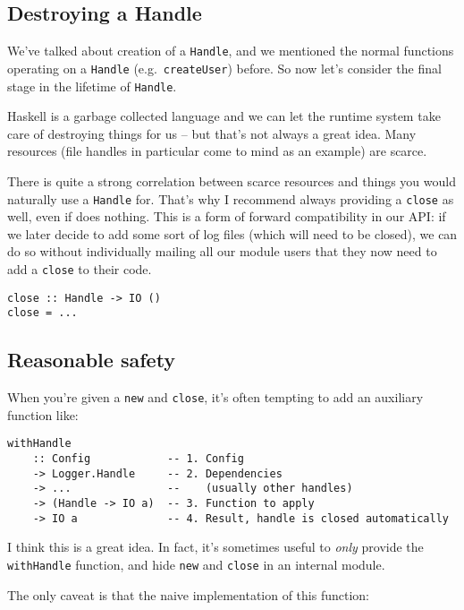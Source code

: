 \subsection{Destroying a Handle}

We've talked about creation of a \texttt{Handle}, and we mentioned the
normal functions operating on a \texttt{Handle}
(e.g.~\texttt{createUser}) before. So now let's consider the final stage
in the lifetime of \texttt{Handle}.

Haskell is a garbage collected language and we can let the runtime
system take care of destroying things for us -- but that's not always a
great idea. Many resources (file handles in particular come to mind as
an example) are scarce.

There is quite a strong correlation between scarce resources and things
you would naturally use a \texttt{Handle} for. That's why I recommend
always providing a \texttt{close} as well, even if does nothing. This is
a form of forward compatibility in our API: if we later decide to add
some sort of log files (which will need to be closed), we can do so
without individually mailing all our module users that they now need to
add a \texttt{close} to their code.

\begin{verbatim}
close :: Handle -> IO ()
close = ...
\end{verbatim}




\subsection{Reasonable safety}

When you're given a \texttt{new} and \texttt{close}, it's often tempting
to add an auxiliary function like:

\begin{verbatim}
withHandle
    :: Config            -- 1. Config
    -> Logger.Handle     -- 2. Dependencies
    -> ...               --    (usually other handles)
    -> (Handle -> IO a)  -- 3. Function to apply
    -> IO a              -- 4. Result, handle is closed automatically
\end{verbatim}
I think this is a great idea. In fact, it's sometimes useful to
\emph{only} provide the \texttt{withHandle} function, and hide
\texttt{new} and \texttt{close} in an internal module.

The only caveat is that the naive implementation of this function:

